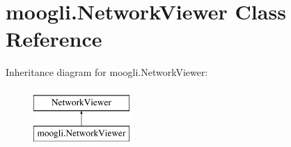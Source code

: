 \hypertarget{classmoogli_1_1NetworkViewer}{\section{moogli.\-Network\-Viewer Class Reference}
\label{classmoogli_1_1NetworkViewer}
}
Inheritance diagram for moogli.\-Network\-Viewer\-:\begin{figure}[H]
\begin{center}
\leavevmode
\includegraphics[height=2.000000cm]{classmoogli_1_1NetworkViewer}
\end{center}
\end{figure}
